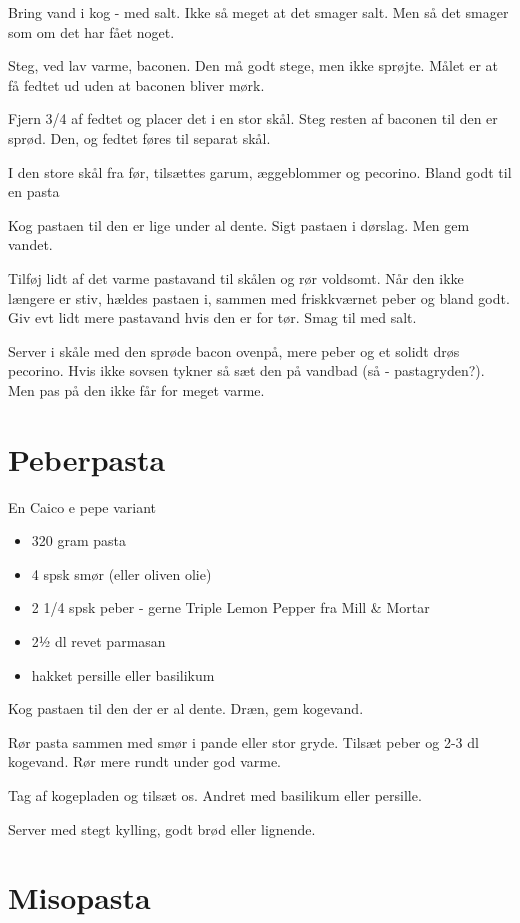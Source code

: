 \documentclass[
]{book}
\providecommand{\tightlist}{%
  \setlength{\itemsep}{0pt}\setlength{\parskip}{0pt}}
\begin{document}
Bring vand i kog - med salt. Ikke så meget at det smager salt.
Men så det smager som om det har fået noget.

Steg, ved lav varme, baconen. Den må godt stege, men ikke sprøjte.
Målet er at få fedtet ud uden at baconen bliver mørk.

Fjern 3/4 af fedtet og placer det i en stor skål.
Steg resten af baconen til den er sprød. Den, og fedtet føres til separat skål.

I den store skål fra før, tilsættes garum, æggeblommer og pecorino.
Bland godt til en pasta

Kog pastaen til den er lige under al dente. Sigt pastaen i dørslag.
Men gem vandet.

Tilføj lidt af det varme pastavand til skålen og rør voldsomt.
Når den ikke længere er stiv, hældes pastaen i, sammen med friskkværnet
peber og bland godt. Giv evt lidt mere pastavand hvis den er for tør.
Smag til med salt.

Server i skåle med den sprøde bacon ovenpå, mere peber og et solidt
drøs pecorino.
Hvis ikke sovsen tykner så sæt den på vandbad (så - pastagryden?).
Men pas på den ikke får for meget varme.

\section{Peberpasta}\label{peberpasta}

En Caico e pepe variant

\begin{itemize}
\tightlist
\item
  320 gram pasta
\item
  4 spsk smør (eller oliven olie)
\item
  2 1/4 spsk peber - gerne Triple Lemon Pepper fra Mill \& Mortar
\item
  2½ dl revet parmasan
\item
  hakket persille eller basilikum
\end{itemize}

Kog pastaen til den der er al dente. Dræn, gem kogevand.

Rør pasta sammen med smør i pande eller stor gryde. Tilsæt peber og 2-3 dl
kogevand. Rør mere rundt under god varme.

Tag af kogepladen og tilsæt os. Andret med basilikum eller persille.

Server med stegt kylling, godt brød eller lignende.

\section{Misopasta}\label{misopasta}
\end{document}
